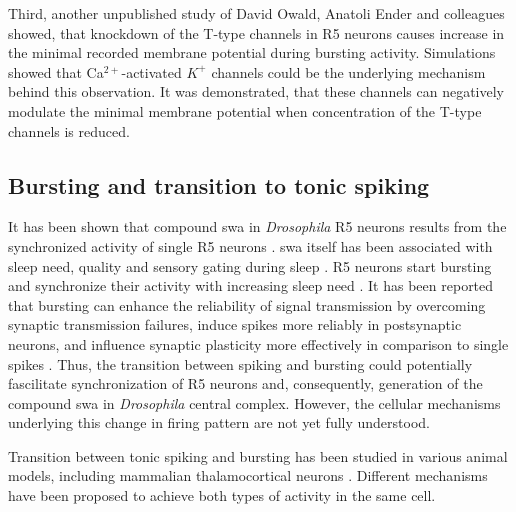 \documentclass[../main.tex]{subfiles}
\begin{document}
Third, another unpublished study of David Owald, Anatoli Ender and colleagues showed, that knockdown of the T-type channels in R5 neurons causes increase in the minimal recorded membrane potential during bursting activity. Simulations showed that Ca$^{2+}$-activated $K^+$ channels could be the underlying mechanism behind this observation. It was demonstrated, that these channels can negatively modulate the minimal membrane potential when concentration of the T-type channels is reduced.


\subsection{Bursting and transition to tonic spiking}

It has been shown that compound \gls{swa} in \textit{Drosophila} R5 neurons results from the synchronized activity of single R5 neurons \parencite{raccugliaNetworkSpecificSynchronizationElectrical2019}. \gls{swa} itself has been associated with sleep need, quality and sensory gating during sleep \parencite{suarez-grimaltNeuralArchitectureSleep2021,raccugliaNetworkSpecificSynchronizationElectrical2019,gentThalamicDualControl2018}. R5 neurons start bursting and synchronize their activity with increasing sleep need \parencite{suarez-grimaltNeuralArchitectureSleep2021}. 
It has been reported that bursting can enhance the reliability of signal transmission by overcoming synaptic transmission failures, induce spikes more reliably in postsynaptic neurons, and influence synaptic plasticity more effectively in comparison to single spikes \parencite{lismanBurstsUnitNeural1997,kimBurstSynchronizationScalefree2019}.
Thus, the transition between spiking and bursting could potentially fascilitate synchronization of R5 neurons and, consequently, generation of the compound \gls{swa} in \textit{Drosophila} central complex. However, the cellular mechanisms underlying this change in firing pattern are not yet fully understood.

Transition between tonic spiking and bursting has been studied in various animal models, including mammalian thalamocortical neurons \parencite{wangMultipleDynamicalModes1994,suzukiTtypeCalciumChannels1989,vickstromTTypeCalciumChannels2020,liuMultipleConductancesCooperatively2008,mccormickModelElectrophysiologicalProperties1992}. Different mechanisms have been proposed to achieve both types of activity in the same cell.
\end{document}
